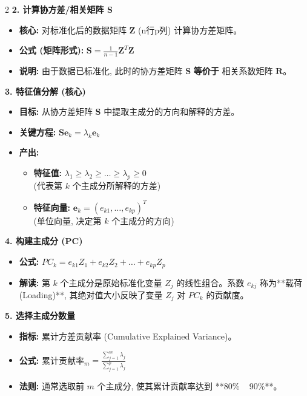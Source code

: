 \documentclass[9pt,a4paper]{article} %
\begin{document}
\begin{multicols}{2}
\textbf{2. 计算协方差/相关矩阵 S}
\begin{itemize}
    \item \textbf{核心:} 对标准化后的数据矩阵 $\mathbf{Z}$ (n行p列) 计算协方差矩阵。
    \item \textbf{公式 (矩阵形式):} $\mathbf{S} = \frac{1}{n-1}\mathbf{Z}^T\mathbf{Z}$
    \item \textbf{说明:} 由于数据已标准化, 此时的协方差矩阵 $\mathbf{S}$ \textbf{等价于} 相关系数矩阵 $\mathbf{R}$。
\end{itemize}

\textbf{3. 特征值分解 (核心)}
\begin{itemize}
    \item \textbf{目标:} 从协方差矩阵 $\mathbf{S}$ 中提取主成分的方向和解释的方差。
    \item \textbf{关键方程:} $\mathbf{S}\mathbf{e}_k = \lambda_k \mathbf{e}_k$
    \item \textbf{产出:}
        \begin{itemize}
            \item \textbf{特征值:} $\lambda_1 \ge \lambda_2 \ge \dots \ge \lambda_p \ge 0$ \\ (代表第 $k$ 个主成分所解释的方差)
            \item \textbf{特征向量:} $\mathbf{e}_k = (e_{k1}, \dots, e_{kp})^T$ \\ (单位向量, 决定第 $k$ 个主成分的方向)
        \end{itemize}
\end{itemize}

\textbf{4. 构建主成分 (PC)}
\begin{itemize}
    \item \textbf{公式:} $PC_k = e_{k1}Z_1 + e_{k2}Z_2 + \dots + e_{kp}Z_p$
    \item \textbf{解读:} 第 $k$ 个主成分是原始标准化变量 $Z_j$ 的线性组合。系数 $e_{kj}$ 称为**载荷(Loading)**, 其绝对值大小反映了变量 $Z_j$ 对 $PC_k$ 的贡献度。
\end{itemize}

\textbf{5. 选择主成分数量}
\begin{itemize}
    \item \textbf{指标:} 累计方差贡献率 (Cumulative Explained Variance)。
    \item \textbf{公式:} 累计贡献率$_m = \frac{\sum_{j=1}^{m}\lambda_j}{\sum_{j=1}^{p}\lambda_j}$
    \item \textbf{法则:} 通常选取前 $m$ 个主成分, 使其累计贡献率达到 **80\% ~ 90\%**。
\end{itemize}


\end{multicols}
\end{document}
